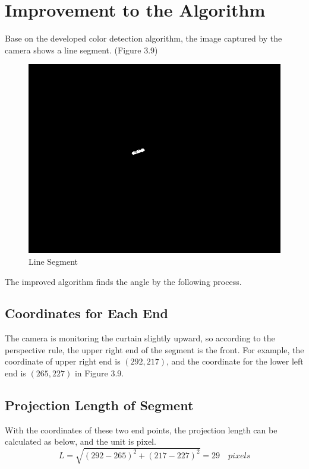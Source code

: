 \section{Improvement to the Algorithm}
Base on the developed color detection algorithm, the image captured by the camera shows a line segment. (Figure 3.9)
\begin{figure}[ht!]
\begin{center}
\includegraphics[scale = 0.6]{pics/segment.png}
\caption{Line Segment}
\end{center}
\end{figure}
The improved algorithm finds the angle by the following process. 
\subsection{Coordinates for Each End}

The camera is monitoring the curtain slightly upward, so according to the perspective rule, the upper right end of the segment is the front. For example, the coordinate of upper right end is $(292,217)$, and the coordinate for the lower left end is $(265, 227)$ in Figure 3.9.

\subsection{Projection Length of Segment}

With the coordinates of these two end points, the projection length can be calculated as below, and the unit is pixel. 
\begin{equation}
L = \sqrt{(292-265)^2+(217-227)^2} = 29 \quad pixels
\end{equation}

